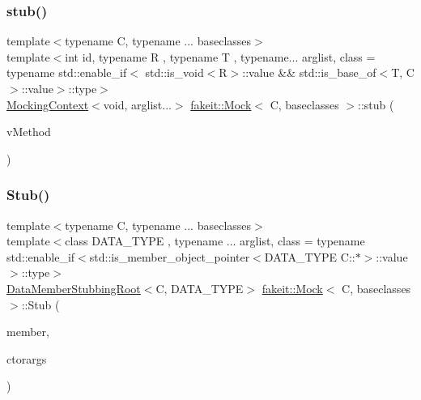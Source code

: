 \mbox{\label{classfakeit_1_1Mock_aeedcaacc82d12295f11c3fc454b75554}} 
\subsubsection{\texorpdfstring{stub()}{stub()}\hspace{0.1cm}{\footnotesize\ttfamily [8/72]}}
{\footnotesize\ttfamily template$<$typename C, typename ... baseclasses$>$ \\
template$<$int id, typename R , typename T , typename... arglist, class  = typename std\+::enable\+\_\+if$<$                std\+::is\+\_\+void$<$\+R$>$\+::value \&\& std\+::is\+\_\+base\+\_\+of$<$\+T, C$>$\+::value$>$\+::type$>$ \\
\mbox{\hyperlink{classfakeit_1_1MockingContext}{Mocking\+Context}}$<$void, arglist...$>$ \mbox{\hyperlink{classfakeit_1_1Mock}{fakeit\+::\+Mock}}$<$ C, baseclasses $>$\+::stub (\begin{DoxyParamCaption}\item[{R(T\+::$\ast$)(arglist...)}]{v\+Method }\end{DoxyParamCaption})\hspace{0.3cm}{\ttfamily [inline]}}

\mbox{\label{classfakeit_1_1Mock_ae210824251ca071933f8a651bbe56047}} 
\subsubsection{\texorpdfstring{Stub()}{Stub()}\hspace{0.1cm}{\footnotesize\ttfamily [2/9]}}
{\footnotesize\ttfamily template$<$typename C, typename ... baseclasses$>$ \\
template$<$class D\+A\+T\+A\+\_\+\+T\+Y\+PE , typename ... arglist, class  = typename std\+::enable\+\_\+if$<$std\+::is\+\_\+member\+\_\+object\+\_\+pointer$<$\+D\+A\+T\+A\+\_\+\+T\+Y\+P\+E C\+::$\ast$$>$\+::value$>$\+::type$>$ \\
\mbox{\hyperlink{classfakeit_1_1DataMemberStubbingRoot}{Data\+Member\+Stubbing\+Root}}$<$C, D\+A\+T\+A\+\_\+\+T\+Y\+PE$>$ \mbox{\hyperlink{classfakeit_1_1Mock}{fakeit\+::\+Mock}}$<$ C, baseclasses $>$\+::Stub (\begin{DoxyParamCaption}\item[{D\+A\+T\+A\+\_\+\+T\+Y\+PE C\+::$\ast$}]{member,  }\item[{const arglist \&...}]{ctorargs }\end{DoxyParamCaption})\hspace{0.3cm}{\ttfamily [inline]}}

